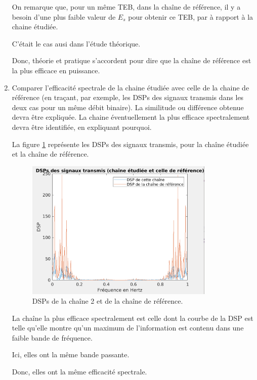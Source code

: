 \documentclass[frenchb]{article}
\begin{document}
\begin{enumerate}
		On remarque que, pour un même TEB, dans la chaîne de référence, il y a besoin d'une plus faible valeur de $E_s$ pour obtenir ce TEB, par à rapport à la chaine étudiée. 
		
		C'était le cas ausi dans l'étude théorique.
		 
		Donc, théorie et pratique s'accordent pour dire que la chaîne de référence est la plus efficace en puissance.

		
		
		\par\leavevmode\par
        \item Comparer l'efficacité spectrale de la chaine étudiée avec celle de la chaine de référence (en traçant, par exemple, les DSPs des signaux transmis dans les deux cas pour un même débit binaire). La similitude ou différence obtenue devra être expliquée. La chaine éventuellement la plus efficace spectralement devra être identifiée, en expliquant pourquoi.
        \par\leavevmode\par
       	\setlength\parindent{0.5cm}
       	La figure \ref{fig : C2F52} représente les DSPs des signaux transmis, pour la chaîne étudiée et la chaîne de référence. 
       	
        
        \begin{figure}[ht!]
		\centering
		\includegraphics[width=9cm]{C2F52.png}		              	    \caption{DSPs de la chaîne 2 et de la chaîne de référence. \label{fig : C2F52}}
		\end{figure}
		
		La chaîne la plus efficace spectralement est celle dont la courbe de la DSP est telle qu'elle montre qu'un maximum de l'information est contenu dans une faible bande de fréquence. 
		
		Ici, elles ont la même bande passante.
		
		Donc, elles ont la même efficacité spectrale. 
		
    \end{enumerate}
\end{document}
